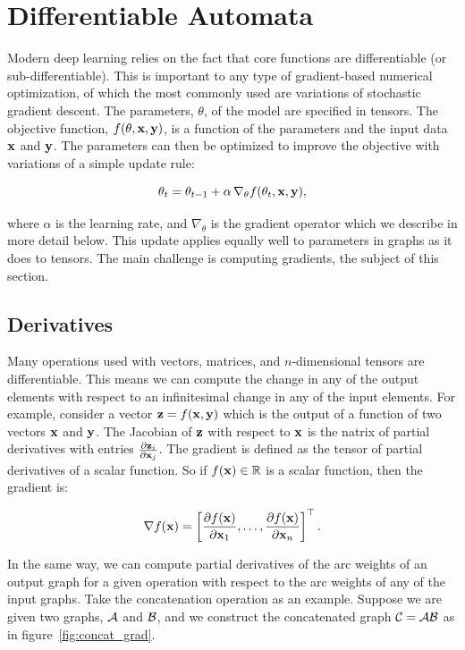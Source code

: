 \section{Differentiable Automata}
\label{sec:differentiable_automata}

Modern deep learning relies on the fact that core functions are differentiable
(or sub-differentiable). This is important to any type of gradient-based
numerical optimization, of which the most commonly used are variations of
stochastic gradient descent. The parameters, $\theta$, of the model are
specified in tensors. The objective function, $f(\theta, {\bf x}, {\bf y})$, is a
function of the parameters and the input data ${\bf x}$ and ${\bf y}$. The parameters
can then be optimized to improve the objective with variations of a simple
update rule:

$$
\theta_t = \theta_{t-1} + \alpha \, \nabla_{\theta} f(\theta_t, {\bf x}, {\bf y}),
$$

where $\alpha$ is the learning rate, and $\nabla_{\theta}$ is the gradient
operator which we describe in more detail below. This update applies equally
well to parameters in graphs as it does to tensors. The main challenge is
computing gradients, the subject of this section.


\subsection{Derivatives}

Many operations used with vectors, matrices, and $n$-dimensional tensors are
differentiable. This means we can compute the change in any of the output
elements with respect to an infinitesimal change in any of the input elements.
For example, consider a vector ${\bf z} = f({\bf x}, {\bf y})$ which is the output of a
function of two vectors ${\bf x}$ and ${\bf y}$. The Jacobian of ${\bf z}$ with respect to
${\bf x}$ is the  natrix of partial derivatives with entries $\frac{\partial
{\bf z}_i}{\partial {\bf x}_j}$. The gradient is defined as the tensor of partial
derivatives of a scalar function. So if $f({\bf x}) \in \mathbb{R}$ is a scalar
function, then the gradient is:

$$
\nabla f({\bf x}) = \left[ \frac{\partial f({\bf x})}{\partial {\bf x}_{1}}, \ldots,
    \frac{\partial f({\bf x})}{\partial {\bf x}_{n}}  \right]^\top.
$$

In the same way, we can compute partial derivatives of the arc weights of an
output graph for a given operation with respect to the arc weights of any of
the input graphs. Take the concatenation operation as an example. Suppose we
are given two graphs, $\mathcal{A}$ and $\mathcal{B}$, and we construct the concatenated graph
$\mathcal{C} = \mathcal{A} \mathcal{B}$ as in figure~\ref{fig:concat_grad}.


